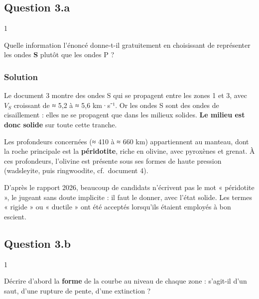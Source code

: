 \documentclass[11pt,a4paper]{article}
\begin{document}
\hypertarget{question-3.a}{%
\subsection{Question 3.a}\label{question-3.a}}

\begin{indication}{1}

Quelle information l'énoncé donne-t-il gratuitement en choisissant de représenter les ondes \textbf{S} plutôt que les ondes P ?

\end{indication}

\hypertarget{solution-7}{%
\subsubsection{Solution}\label{solution-7}}

Le document 3 montre des ondes S qui se propagent entre les zones 1 et 3, avec \(V_S\) croissant de ≈ 5,2 à ≈ 5,6 km·s⁻¹. Or les ondes S sont des ondes de cisaillement : elles ne se propagent que dans les milieux solides. \textbf{Le milieu est donc solide} sur toute cette tranche.

Les profondeurs concernées (≈ 410 à ≈ 660 km) appartiennent au manteau, dont la roche principale est la \textbf{péridotite}, riche en olivine, avec pyroxènes et grenat. À ces profondeurs, l'olivine est présente sous ses formes de haute pression (wadsleyite, puis ringwoodite, cf.~document 4).

\begin{jury}

D'après le rapport 2026, beaucoup de candidats n'écrivent pas le mot « péridotite », le jugeant sans doute implicite : il faut le donner, avec l'état solide. Les termes « rigide » ou « ductile » ont été acceptés lorsqu'ils étaient employés à bon escient.

\end{jury}

\hypertarget{question-3.b}{%
\subsection{Question 3.b}\label{question-3.b}}

\begin{indication}{1}

Décrire d'abord la \textbf{forme} de la courbe au niveau de chaque zone : s'agit-il d'un saut, d'une rupture de pente, d'une extinction ?

\end{indication}
\end{document}
